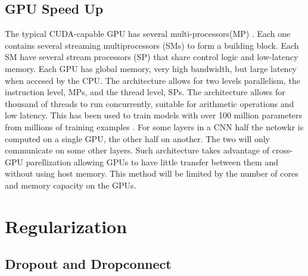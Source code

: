         
        \subsection{GPU Speed Up}


The typical CUDA-capable GPU has several multi-processors(MP)\citep{chen2014big} .
Each one contains several streaming multiprocessors (SMs) to form a building block.
Each SM have several stream processors (SP) that share control logic and low-latency memory.
Each GPU has global memory, very high bandwidth, but large latency when accesed by the CPU.
The architecture allows for two levels parallelism, the instruction level, MPs, and the thread level, SPs.
The architecture allows for thousand of threads to run concurrently, suitable for arithmetic operations and low latency.
This has been used to train models with over 100 million parameters from millions of training examples .
For some layers in a CNN half the netowkr is computed on a single GPU, the other half on another.
The two will only communicate on some  other layers.
Such architecture takes advantage of cross-GPU parellization allowing GPUs to have little transfer between them and without using host memory.
This method will be limited by the number of cores and memory capacity on the GPUs.
        
        
              
    \section{Regularization}
    
    
        
        \subsection{Dropout and Dropconnect}
        
        
        
